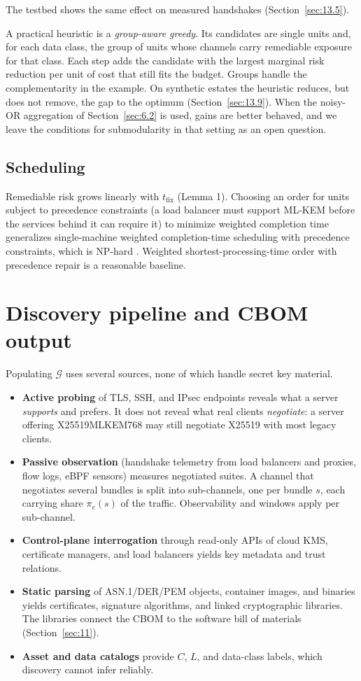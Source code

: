 \documentclass[conference]{IEEEtran}
\newcommand{\tfix}{t_{\mathrm{fix}}}
\begin{document}
The testbed shows the same effect on measured handshakes (Section~\ref{sec:13.5}).

A practical heuristic is a \emph{group-aware greedy}. Its candidates are single units and, for each data class, the group of units whose channels carry remediable exposure for that class. Each step adds the candidate with the largest marginal risk reduction per unit of cost that still fits the budget. Groups handle the complementarity in the example. On synthetic estates the heuristic reduces, but does not remove, the gap to the optimum (Section~\ref{sec:13.9}). When the noisy-OR aggregation of Section~\ref{sec:6.2} is used, gains are better behaved, and we leave the conditions for submodularity in that setting as an open question.

\subsection{Scheduling}\label{sec:8.3}

Remediable risk grows linearly with $\tfix$ (Lemma 1). Choosing an order for units subject to precedence constraints (a load balancer must support ML-KEM before the services behind it can require it) to minimize weighted completion time generalizes single-machine weighted completion-time scheduling with precedence constraints, which is NP-hard \cite{lenstra1978}. Weighted shortest-processing-time order with precedence repair is a reasonable baseline.

\section{Discovery pipeline and CBOM output}\label{sec:9}

Populating $\mathcal{G}$ uses several sources, none of which handle secret key material.

\begin{itemize}
\item \textbf{Active probing} of TLS, SSH, and IPsec endpoints reveals what a server \emph{supports} and prefers. It does not reveal what real clients \emph{negotiate}: a server offering X25519MLKEM768 may still negotiate X25519 with most legacy clients.
\item \textbf{Passive observation} (handshake telemetry from load balancers and proxies, flow logs, eBPF sensors) measures negotiated suites. A channel that negotiates several bundles is split into sub-channels, one per bundle $s$, each carrying share $\pi_e(s)$ of the traffic. Observability and windows apply per sub-channel.
\item \textbf{Control-plane interrogation} through read-only APIs of cloud KMS, certificate managers, and load balancers yields key metadata and trust relations.
\item \textbf{Static parsing} of ASN.1/DER/PEM objects, container images, and binaries yields certificates, signature algorithms, and linked cryptographic libraries. The libraries connect the CBOM to the software bill of materials (Section~\ref{sec:11}).
\item \textbf{Asset and data catalogs} provide $C$, $L$, and data-class labels, which discovery cannot infer reliably.
\end{itemize}
\end{document}
